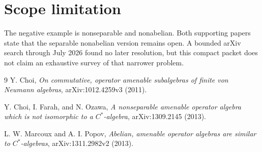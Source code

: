 \documentclass[10pt]{article}
\begin{document}
\section*{Scope limitation}

The negative example is nonseparable and nonabelian. Both supporting papers
state that the separable nonabelian version remains open. A bounded arXiv
search through July 2026 found no later resolution, but this compact packet
does not claim an exhaustive survey of that narrower problem.

\begin{thebibliography}{9}
Y. Choi,
\emph{On commutative, operator amenable subalgebras of finite von Neumann
algebras}, arXiv:1012.4259v3 (2011).

Y. Choi, I. Farah, and N. Ozawa,
\emph{A nonseparable amenable operator algebra which is not isomorphic to a
$C^*$-algebra}, arXiv:1309.2145 (2013).

L. W. Marcoux and A. I. Popov,
\emph{Abelian, amenable operator algebras are similar to $C^*$-algebras},
arXiv:1311.2982v2 (2013).
\end{thebibliography}
\end{document}
